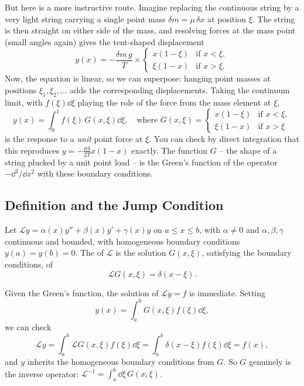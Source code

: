But here is a more instructive route. Imagine replacing the continuous string by a very light string carrying a single point mass $\delta m = \mu \, \delta x$ at position $\xi$. The string is then straight on either side of the mass, and resolving forces at the mass point (small angles again) gives the tent-shaped displacement
$$
y(x) = -\frac{\delta m\, g}{T} \times \begin{cases}
    x (1 - \xi) &\mbox{if } x < \xi, \\
    \xi (1 - x) &\mbox{if } x > \xi.
\end{cases}
$$
Now, the equation is linear, so we can superpose: hanging point masses at positions $\xi_1, \xi_2, \dots$ adds the corresponding displacements. Taking the continuum limit, with $f(\xi) \dd \xi$ playing the role of the force from the mass element at $\xi$,
$$
y(x) = \int_0^1 f(\xi)\, G(x, \xi) \dd \xi, \quad \text{where } G(x, \xi) = \begin{cases}
    x(1 - \xi) &\mbox{if } x < \xi, \\
    \xi(1 - x) &\mbox{if } x > \xi
\end{cases}
$$
is the response to a \emph{unit} point force at $\xi$. You can check by direct integration that this reproduces $y = -\frac{\mu g}{2T}x(1 - x)$ exactly. The function $G$ -- the shape of a string plucked by a unit point load -- is the Green's function of the operator $-\dd^2/\dd x^2$ with these boundary conditions.

\subsection{Definition and the Jump Condition}

\begin{definition}
    Let $\mathcal{L} y = \alpha(x) y'' + \beta(x) y' + \gamma(x) y$ on $a \leq x \leq b$, with $\alpha \neq 0$ and $\alpha, \beta, \gamma$ continuous and bounded, with homogeneous boundary conditions $y(a) = y(b) = 0$. The  of $\mathcal{L}$ is the solution $G(x, \xi)$, satisfying the boundary conditions, of
    $$
    \mathcal{L} G(x, \xi) = \delta(x - \xi).
    $$
\end{definition}

Given the Green's function, the solution of $\mathcal{L}y = f$ is immediate. Setting
$$
y(x) = \int_a^b G(x, \xi) f(\xi) \dd \xi,
$$
we can check
$$
\mathcal{L} y = \int_a^b \mathcal{L}G(x, \xi) f(\xi) \dd \xi = \int_a^b \delta(x - \xi) f(\xi) \dd \xi = f(x),
$$
and $y$ inherits the homogeneous boundary conditions from $G$. So $G$ genuinely is the inverse operator: $\mathcal{L}^{-1} = \int_a^b \dd \xi \, G(x, \xi)$.

